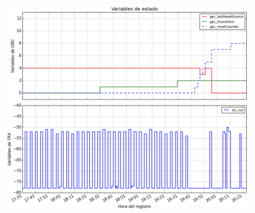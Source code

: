 \documentclass[xcolor=dvipsnames]{beamer}
\begin{document}
\begin{frame}[allowframebreaks]
        \begin{center}
            \includegraphics[height=0.95\textheight]{img/plot_status_var.png}
        \end{center}
    \end{frame}
    
\end{document}
